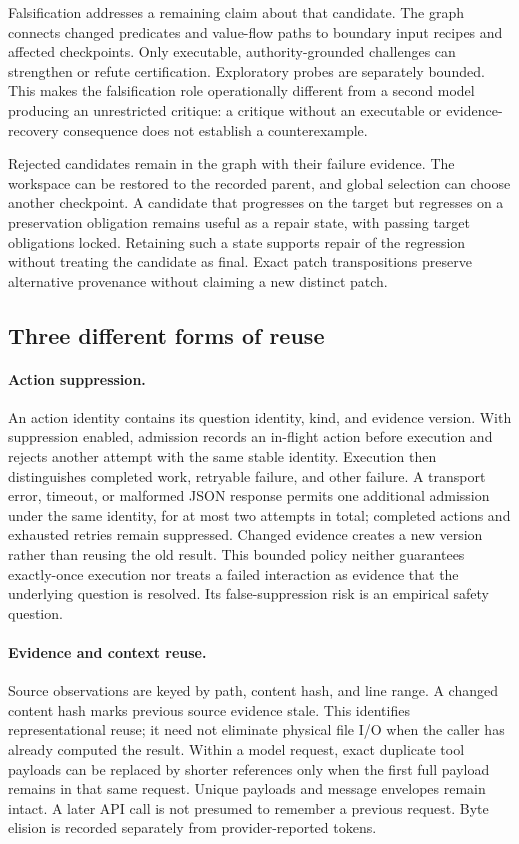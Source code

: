 \documentclass[acmsmall,screen,review,anonymous]{acmart}
\begin{document}
Falsification addresses a remaining claim about that candidate. The graph connects changed predicates and value-flow paths to boundary input recipes and affected checkpoints. Only executable, authority-grounded challenges can strengthen or refute certification. Exploratory probes are separately bounded. This makes the falsification role operationally different from a second model producing an unrestricted critique: a critique without an executable or evidence-recovery consequence does not establish a counterexample.

Rejected candidates remain in the graph with their failure evidence. The workspace can be restored to the recorded parent, and global selection can choose another checkpoint. A candidate that progresses on the target but regresses on a preservation obligation remains useful as a repair state, with passing target obligations locked. Retaining such a state supports repair of the regression without treating the candidate as final. Exact patch transpositions preserve alternative provenance without claiming a new distinct patch.

\subsection{Three different forms of reuse}
\paragraph{Action suppression.}
An action identity contains its question identity, kind, and evidence version. With suppression enabled, admission records an in-flight action before execution and rejects another attempt with the same stable identity. Execution then distinguishes completed work, retryable failure, and other failure. A transport error, timeout, or malformed JSON response permits one additional admission under the same identity, for at most two attempts in total; completed actions and exhausted retries remain suppressed. Changed evidence creates a new version rather than reusing the old result. This bounded policy neither guarantees exactly-once execution nor treats a failed interaction as evidence that the underlying question is resolved. Its false-suppression risk is an empirical safety question.

\paragraph{Evidence and context reuse.}
Source observations are keyed by path, content hash, and line range. A changed content hash marks previous source evidence stale. This identifies representational reuse; it need not eliminate physical file I/O when the caller has already computed the result. Within a model request, exact duplicate tool payloads can be replaced by shorter references only when the first full payload remains in that same request. Unique payloads and message envelopes remain intact. A later API call is not presumed to remember a previous request. Byte elision is recorded separately from provider-reported tokens.
\end{document}
